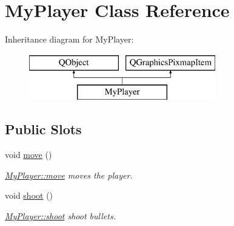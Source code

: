 \hypertarget{class_my_player}{}\section{My\+Player Class Reference}
\label{class_my_player}
Inheritance diagram for My\+Player\+:\begin{figure}[H]
\begin{center}
\leavevmode
\includegraphics[height=2.000000cm]{class_my_player}
\end{center}
\end{figure}
\subsection*{Public Slots}
\begin{DoxyCompactItemize}
\item 
\hypertarget{class_my_player_a285f57dbb01b962385de6f323f1c847c}{}void \hyperlink{class_my_player_a285f57dbb01b962385de6f323f1c847c}{move} ()\label{class_my_player_a285f57dbb01b962385de6f323f1c847c}

\begin{DoxyCompactList}\small\item\em \hyperlink{class_my_player_a285f57dbb01b962385de6f323f1c847c}{My\+Player\+::move} moves the player. \end{DoxyCompactList}\item 
\hypertarget{class_my_player_ac00726202004d1d5aef9b7410bfce6ad}{}void \hyperlink{class_my_player_ac00726202004d1d5aef9b7410bfce6ad}{shoot} ()\label{class_my_player_ac00726202004d1d5aef9b7410bfce6ad}

\begin{DoxyCompactList}\small\item\em \hyperlink{class_my_player_ac00726202004d1d5aef9b7410bfce6ad}{My\+Player\+::shoot} shoot bullets. \end{DoxyCompactList}\end{DoxyCompactItemize}
